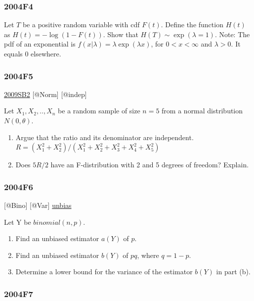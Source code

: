 \documentclass[10pt,twocolumn,portrait]{article}
\begin{document}
\hypertarget{f4-2}{%
\subsubsection{2004F4}\label{f4-2}}

Let \(T\) be a positive random variable with cdf \(F(t)\). Define the
function \(H(t)\) as \(H(t)=-\log(1-F(t))\). Show that
\(H (T)\sim\exp(\lambda=1)\). Note: The pdf of an exponential is
\(f(x|\lambda)=\lambda\exp(\lambda x)\), for \(0<x<\infty\) and
\(\lambda>0\). It equals 0 elsewhere.

\hypertarget{f5-2}{%
\subsubsection{2004F5}\label{f5-2}}

\protect\hyperlink{sb2}{2009SB2} {[}@Norm{]} {[}@indep{]}

Let \(X_1,X_2,..,X_n\) be a random sample of size \(n=5\) from a normal
distribution \(N(0,\theta)\).

\begin{enumerate}
\def\labelenumi{(\alph{enumi})}
\item
  Argue that the ratio and its denominator are independent.
  \(R=(X_1^2+ X_2^2)/(X_1^2+ X_2^2+X_3^2+ X_4^2+X_5^2)\)
\item
  Does \(5R/2\) have an F-distribution with 2 and 5 degrees of freedom?
  Explain.
\end{enumerate}

\hypertarget{f6-2}{%
\subsubsection{2004F6}\label{f6-2}}

{[}@Bino{]} {[}@Var{]} \protect\hyperlink{section-4}{unbias}

Let Y be \(binomial(n,p)\).

\begin{enumerate}
\def\labelenumi{(\alph{enumi})}
\item
  Find an unbiased estimator \(a(Y)\) of \(p\).
\item
  Find an unbiased estimator \(b(Y)\) of \(pq\), where \(q=1-p\).
\item
  Determine a lower bound for the variance of the estimator \(b(Y)\) in
  part (b).
\end{enumerate}

\hypertarget{f7-2}{%
\subsubsection{2004F7}\label{f7-2}}
\end{document}
